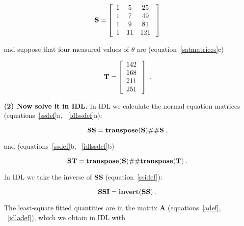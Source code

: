 \begin{mathletters}
\begin{eqnarray}
{\bf S} = \left[
\begin{array}{ccc}
1  &  5   &  25  \\
1  &  7   &  49  \\
1  &  9   &  81  \\
1  &  11  &  121 \\
\end{array} \; \right] 
\end{eqnarray}
\end{mathletters}

\noindent and suppose that four measured values of $\theta$ are
(equation~\ref{satmatrices}c)

\begin{mathletters}
\begin{eqnarray}
{\bf T} = \left[
\begin{array}{c}
142 \\
168 \\
211 \\
251 \\
\end{array} \; \right] \; .
\end{eqnarray}
\end{mathletters}

	{\bf (2) Now solve it in IDL.} In IDL we calculate the normal
equation matrices (equations~\ref{ssdef}a, ~\ref{idlssdef}a):

\begin{mathletters}
\begin{equation}
{\bf SS} = {\bf transpose(S) \# \# S} \; ,
\end{equation}

\noindent and (equations~\ref{ssdef}b, ~\ref{idlssdef}b)

\begin{equation}
{\bf ST} = {\bf transpose(S) \# \# transpose(T)} \; .
\end{equation}
\end{mathletters}

\noindent In IDL we take the inverse of {\bf SS} (equation~\ref{ssidef}):

\begin{equation}
{\bf SSI} = {\bf invert(SS)} \; .
\end{equation}

	The least-square fitted quantities are in the matrix {\bf A}
(equations~\ref{adef}, ~\ref{idladef}), which we obtain in IDL with

